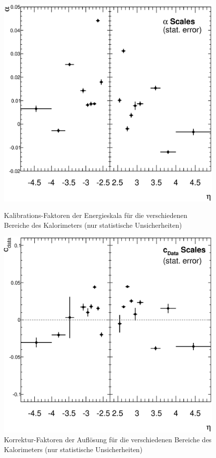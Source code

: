 \begin{figure}[h]
    \begin{minipage}{0.48\textwidth}
        \centering
        \includegraphics[width=1.\textwidth]{plots/alpha_stat}
        \captionsetup{format=plain}
        \caption{Kalibrations-Faktoren der Energieskala für die verschiedenen
            Bereiche des Kalorimeters (nur statistische Unsicherheiten)}
        \label{fig:alpha_stat}
    \end{minipage}
    \hfill
    \begin{minipage}{0.48\textwidth}
        \centering
        \includegraphics[width=1.\textwidth]{plots/cdata_stat}
        \captionsetup{format=plain}
        \caption{Korrektur-Faktoren der Auflösung für die verschiedenen
            Bereiche des Kalorimeters (nur statistische Unsicherheiten)}
        \label{fig:cdata_stat}
    \end{minipage}
\end{figure}

